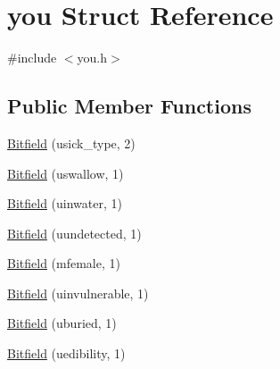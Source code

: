 \hypertarget{structyou}{\section{you Struct Reference}
\label{structyou}
}


{\ttfamily \#include $<$you.\+h$>$}

\subsection*{Public Member Functions}
\begin{DoxyCompactItemize}
\item 
\hyperlink{structyou_a28143e6c0e04376a4209819c2e208096}{Bitfield} (usick\+\_\+type, 2)
\item 
\hyperlink{structyou_a0e1fb3fe40bf40f7b636b3d7bb7b43a2}{Bitfield} (uswallow, 1)
\item 
\hyperlink{structyou_aba146f6557ac57b74f899a01512975a1}{Bitfield} (uinwater, 1)
\item 
\hyperlink{structyou_abb41ef68efeeb54399bf2277bfc2b93d}{Bitfield} (uundetected, 1)
\item 
\hyperlink{structyou_a94ffb0d9b28867a705037a567855ac43}{Bitfield} (mfemale, 1)
\item 
\hyperlink{structyou_a55cd9295d25088c10c9bee2990173795}{Bitfield} (uinvulnerable, 1)
\item 
\hyperlink{structyou_a956a0eb494b89c58bf16b224b04a26ad}{Bitfield} (uburied, 1)
\item 
\hyperlink{structyou_a333e153232236ceb0205de0c8f77f5af}{Bitfield} (uedibility, 1)
\end{DoxyCompactItemize}

